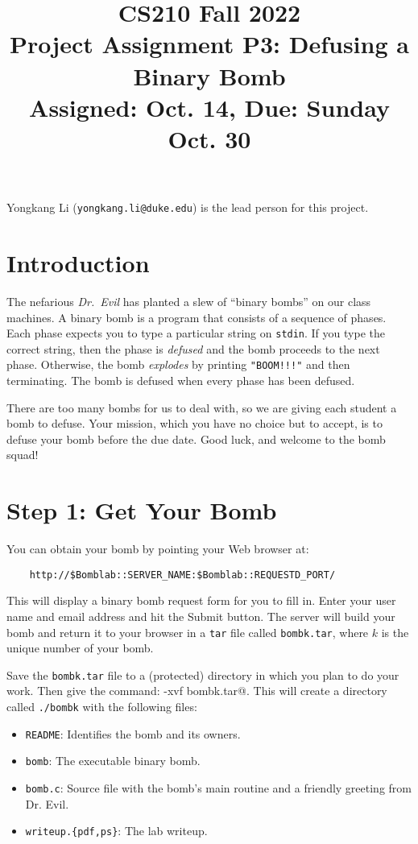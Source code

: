 \documentclass[11pt]{article}
\title{CS210 Fall 2022\\
Project Assignment P3: Defusing a Binary Bomb\\
Assigned: Oct. 14, Due: Sunday Oct. 30\\
}
\author{}
\date{}
\begin{document}
\maketitle

Yongkang Li ({\tt yongkang.li@duke.edu}) is the lead person for this project.

\section{Introduction}

The nefarious {\em Dr.~Evil} has planted a slew of ``binary bombs'' on
our class machines.  A binary bomb is a program that consists of a
sequence of phases. Each phase expects you to type a particular string
on \texttt{stdin}.  If you type the correct string, then the phase is
{\em defused} and the bomb proceeds to the next phase. Otherwise, the
bomb {\em explodes} by printing \verb."BOOM!!!". and then
terminating. The bomb is defused when every phase has been defused.

There are too many bombs for us to deal with, so we are giving each
student a bomb to defuse.  Your mission, which you have no choice but to
accept, is to defuse your bomb before the due date.  Good luck, and
welcome to the bomb squad!

\section*{Step 1: Get Your Bomb}

You can obtain your bomb by pointing your Web browser at:

\begin{verbatim}
    http://$Bomblab::SERVER_NAME:$Bomblab::REQUESTD_PORT/
\end{verbatim}

This will display a binary bomb request form for you to fill in.
Enter your user name and email address and hit the Submit button.  The
server will build your bomb and return it to your browser in a
\texttt{tar} file called \texttt{bombk.tar}, where $k$ is the unique
number of your bomb.

Save the \texttt{bombk.tar} file to a (protected) directory
in which you plan to do your work.  Then give the command: 
\verb@tar -xvf bombk.tar@.  This will create a directory called
\texttt{./bombk} with the following files:
\begin{itemize}
\item \texttt{README}: Identifies the bomb and its owners.
\item \texttt{bomb}: The executable binary bomb.
\item \texttt{bomb.c}: Source file with the bomb's main routine and a friendly greeting from Dr. Evil.
\item \texttt{writeup.\{pdf,ps\}}: The lab writeup.
\end{itemize}
\end{document}
